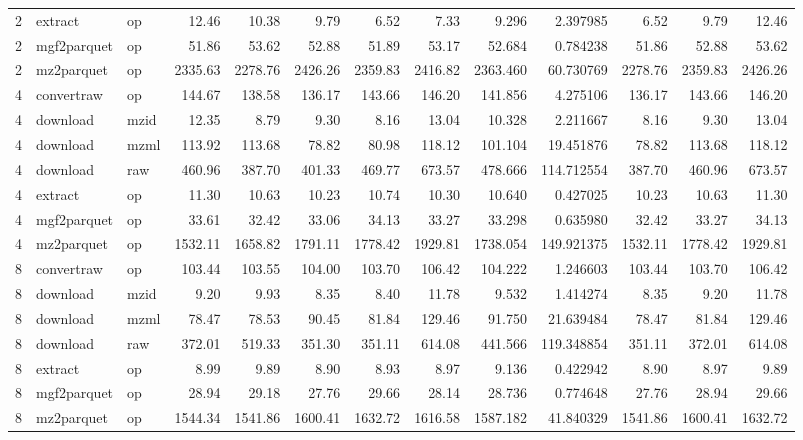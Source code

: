 \begin{longtable}{rllrrrrrrrrrr}
     2 &      extract &    op &    12.46 &    10.38 &     9.79 &     6.52 &     7.33 &     9.296 &    2.397985 &     6.52 &     9.79 &    12.46 \\
     2 &  mgf2parquet &    op &    51.86 &    53.62 &    52.88 &    51.89 &    53.17 &    52.684 &    0.784238 &    51.86 &    52.88 &    53.62 \\
     2 &   mz2parquet &    op &  2335.63 &  2278.76 &  2426.26 &  2359.83 &  2416.82 &  2363.460 &   60.730769 &  2278.76 &  2359.83 &  2426.26 \\
     4 &   convertraw &    op &   144.67 &   138.58 &   136.17 &   143.66 &   146.20 &   141.856 &    4.275106 &   136.17 &   143.66 &   146.20 \\
     4 &     download &  mzid &    12.35 &     8.79 &     9.30 &     8.16 &    13.04 &    10.328 &    2.211667 &     8.16 &     9.30 &    13.04 \\
     4 &     download &  mzml &   113.92 &   113.68 &    78.82 &    80.98 &   118.12 &   101.104 &   19.451876 &    78.82 &   113.68 &   118.12 \\
     4 &     download &   raw &   460.96 &   387.70 &   401.33 &   469.77 &   673.57 &   478.666 &  114.712554 &   387.70 &   460.96 &   673.57 \\
     4 &      extract &    op &    11.30 &    10.63 &    10.23 &    10.74 &    10.30 &    10.640 &    0.427025 &    10.23 &    10.63 &    11.30 \\
     4 &  mgf2parquet &    op &    33.61 &    32.42 &    33.06 &    34.13 &    33.27 &    33.298 &    0.635980 &    32.42 &    33.27 &    34.13 \\
     4 &   mz2parquet &    op &  1532.11 &  1658.82 &  1791.11 &  1778.42 &  1929.81 &  1738.054 &  149.921375 &  1532.11 &  1778.42 &  1929.81 \\
     8 &   convertraw &    op &   103.44 &   103.55 &   104.00 &   103.70 &   106.42 &   104.222 &    1.246603 &   103.44 &   103.70 &   106.42 \\
     8 &     download &  mzid &     9.20 &     9.93 &     8.35 &     8.40 &    11.78 &     9.532 &    1.414274 &     8.35 &     9.20 &    11.78 \\
     8 &     download &  mzml &    78.47 &    78.53 &    90.45 &    81.84 &   129.46 &    91.750 &   21.639484 &    78.47 &    81.84 &   129.46 \\
     8 &     download &   raw &   372.01 &   519.33 &   351.30 &   351.11 &   614.08 &   441.566 &  119.348854 &   351.11 &   372.01 &   614.08 \\
     8 &      extract &    op &     8.99 &     9.89 &     8.90 &     8.93 &     8.97 &     9.136 &    0.422942 &     8.90 &     8.97 &     9.89 \\
     8 &  mgf2parquet &    op &    28.94 &    29.18 &    27.76 &    29.66 &    28.14 &    28.736 &    0.774648 &    27.76 &    28.94 &    29.66 \\
     8 &   mz2parquet &    op &  1544.34 &  1541.86 &  1600.41 &  1632.72 &  1616.58 &  1587.182 &   41.840329 &  1541.86 &  1600.41 &  1632.72 \\
\end{longtable}
